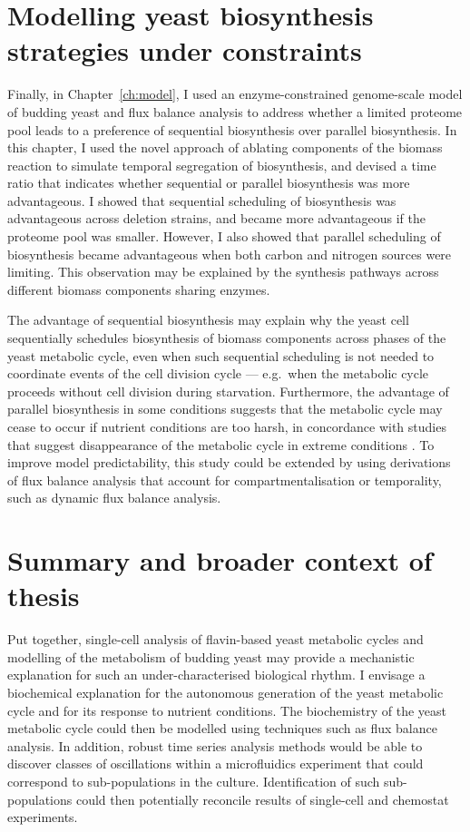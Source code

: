 \section{Modelling yeast biosynthesis strategies under constraints}
\label{sec:concl-model}

Finally, in Chapter~\ref{ch:model}, I used an enzyme-constrained genome-scale model of budding yeast and flux balance analysis to address whether a limited proteome pool leads to a preference of sequential biosynthesis over parallel biosynthesis.
In this chapter, I used the novel approach of ablating components of the biomass reaction to simulate temporal segregation of biosynthesis, and devised a time ratio that indicates whether sequential or parallel biosynthesis was more advantageous.
I showed that sequential scheduling of biosynthesis was advantageous across deletion strains, and became more advantageous if the proteome pool was smaller.
However, I also showed that parallel scheduling of biosynthesis became advantageous when both carbon and nitrogen sources were limiting.
This observation may be explained by the synthesis pathways across different biomass components sharing enzymes.

The advantage of sequential biosynthesis may explain why the yeast cell sequentially schedules biosynthesis of biomass components across phases of the yeast metabolic cycle, even when such sequential scheduling is not needed to coordinate events of the cell division cycle --- e.g.\ when the metabolic cycle proceeds without cell division during starvation.
Furthermore, the advantage of parallel biosynthesis in some conditions suggests that the metabolic cycle may cease to occur if nutrient conditions are too harsh, in concordance with studies that suggest disappearance of the metabolic cycle in extreme conditions \parencite{oneillEukaryoticCellBiology2020}.
To improve model predictability, this study could be extended by using derivations of flux balance analysis that account for compartmentalisation or temporality, such as dynamic flux balance analysis.


\section{Summary and broader context of thesis}
\label{sec:concl-summary}

Put together, single-cell analysis of flavin-based yeast metabolic cycles and modelling of the metabolism of budding yeast may provide a mechanistic explanation for such an under-characterised biological rhythm.
I envisage a biochemical explanation for the autonomous generation of the yeast metabolic cycle and for its response to nutrient conditions.
The biochemistry of the yeast metabolic cycle could then be modelled using techniques such as flux balance analysis.
In addition, robust time series analysis methods would be able to discover classes of oscillations within a microfluidics experiment that could correspond to sub-populations in the culture.
Identification of such sub-populations could then potentially reconcile results of single-cell and chemostat experiments.

